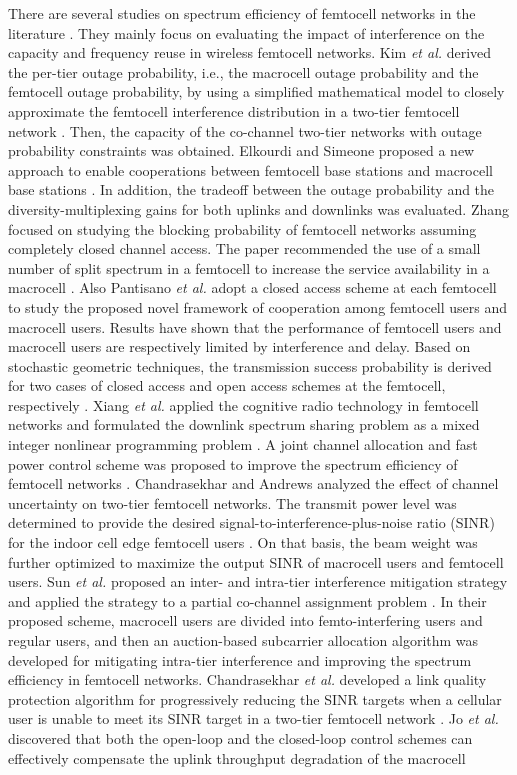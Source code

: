 \documentclass[10pt,final,journal,letterpaper,twoside,twocolumn]{IEEEtran}
\begin{document}
There are several studies on spectrum efficiency of femtocell networks in the literature \cite{Kim10,Elkourdi11,Zhang10,Pantisano12,Cheung12,Xiang10,Oh11,Chandrasekharand09,Sun12,Chandrasekhar09,Jo09,Xia10}. They mainly focus on evaluating the impact of interference on the capacity and frequency reuse in wireless femtocell networks. Kim \textit{et al.} derived the per-tier outage probability, i.e., the macrocell outage probability and the femtocell outage probability, by using a simplified mathematical model to closely approximate the femtocell interference distribution in a two-tier femtocell network \cite{Kim10}. Then, the capacity of the co-channel two-tier networks with outage probability constraints was obtained. Elkourdi and Simeone proposed a new approach to enable cooperations between femtocell base stations and macrocell base stations \cite{Elkourdi11}. In addition, the tradeoff between the outage probability and the diversity-multiplexing gains for both uplinks and downlinks was evaluated. Zhang focused on studying the blocking probability of femtocell networks assuming completely closed channel access. The paper recommended the use of a small number of split spectrum in a femtocell to increase the service availability in a macrocell \cite{Zhang10}. Also Pantisano \textit{et al.} \cite{Pantisano12} adopt a closed access scheme at each femtocell to study the proposed novel framework of cooperation among femtocell users and macrocell users. Results have shown that the performance of femtocell users and macrocell users are respectively limited by interference and delay. Based on stochastic geometric techniques, the transmission success probability is derived for two cases of closed access and open access schemes at the femtocell, respectively \cite{Cheung12}. Xiang \textit{et al.} applied the cognitive radio technology in femtocell
networks and formulated the downlink spectrum sharing problem as a mixed integer nonlinear programming problem \cite{Xiang10}. A joint channel allocation and fast power control scheme was proposed to improve the spectrum efficiency of femtocell networks \cite{Oh11}. Chandrasekhar and Andrews analyzed the effect of channel uncertainty on two-tier femtocell networks. The transmit power level was determined to provide the desired signal-to-interference-plus-noise ratio (SINR) for the indoor cell edge femtocell users \cite{Chandrasekharand09}. On that basis, the beam weight was further optimized to maximize the output SINR of macrocell users and femtocell users. Sun \textit{et al.} proposed an inter- and intra-tier interference mitigation strategy and applied the strategy to a partial co-channel assignment problem \cite{Sun12}. In their proposed scheme, macrocell users are divided into femto-interfering users and regular users, and then an auction-based subcarrier allocation algorithm was developed for mitigating intra-tier interference and improving the spectrum efficiency in femtocell networks. Chandrasekhar \textit{et al.} developed a link quality protection algorithm for progressively reducing the SINR targets when a cellular user is unable to meet its SINR target in a two-tier femtocell network \cite{Chandrasekhar09}. Jo \textit{et al.} discovered that both the open-loop and the closed-loop control schemes can effectively compensate the uplink throughput degradation of the macrocell
\end{document}
